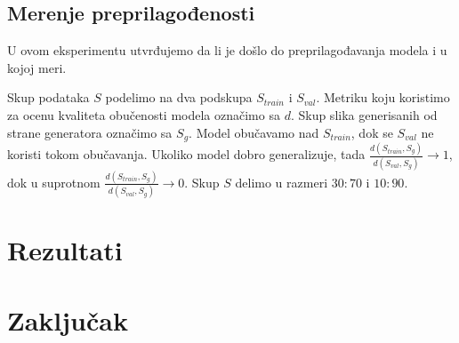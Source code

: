 \documentclass[12pt, a4paper]{article}
\begin{document}
\subsection{Merenje preprilagođenosti}
U ovom eksperimentu utvrđujemo da li je došlo do preprilagođavanja modela i u kojoj meri.

Skup podataka $S$ podelimo na dva podskupa $S_{train}$ i $S_{val}$. Metriku koju koristimo za ocenu kvaliteta obučenosti modela označimo sa $d$. Skup slika generisanih od strane generatora označimo sa $S_g$. Model obučavamo nad $S_{train}$, dok se $S_{val}$ ne koristi tokom obučavanja. Ukoliko model dobro generalizuje, tada $\frac{d(S_{train}, S_g)}{d(S_{val}, S_g)} \rightarrow 1$, dok u suprotnom $\frac{d(S_{train}, S_g)}{d(S_{val}, S_g)} \rightarrow 0$. Skup $S$ delimo u razmeri $30:70$ i $10:90$.

\section{Rezultati}

\section{Zaključak}
\end{document}
